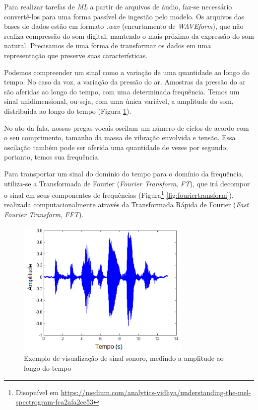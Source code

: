 Para realizar tarefas de \textit{ML} a partir de arquivos de áudio, faz-se necessário convertê-los para uma forma passível de ingestão pelo modelo. Os arquivos das bases de dados estão em formato \textit{.wav} (encurtamento de \textit{WAVEform}), que não realiza compressão do som digital, mantendo-o mais próximo da expressão do som natural. Precisamos de uma forma de transformar os dados em uma representação que preserve suas características.

Podemos compreender um sinal como a variação de uma quantidade ao longo do tempo. No caso da voz, a variação da pressão do ar. Amostras da pressão do ar são aferidas ao longo do tempo, com uma determinada frequência. Temos um sinal unidimensional, ou seja, com uma única variável, a amplitude do som, distribuida ao longo do tempo (Figura \ref{fig:exsinalsom}).

No ato da fala, nossas pregas vocais oscilam um número de ciclos de acordo com o  seu comprimento, tamanho da massa de vibração envolvida e tensão. Essa oscilação também pode ser aferida uma quantidade de vezes por segundo, portanto, temos sua frequência.

Para transportar um sinal do domínio do tempo para o domínio da frequência, utiliza-se a Transformada de Fourier (\textit{Fourier Transform}, \textit{FT}), que irá decompor o sinal em seus componentes de frequências (Figura\footnote{Disopnível em \url{https://medium.com/analytics-vidhya/understanding-the-mel-spectrogram-fca2afa2ce53}} \ref{fig:fouriertransform}), realizada computacionalmente através da Transformada Rápida de Fourier (\textit{Fast Fourier Transform}, \textit{FFT}). %

\clearpage

\begin{figure}[!h]
\centering
\includegraphics[width=0.75\textwidth]{imagens/exsinalsom.PNG}
\caption{\label{fig:exsinalsom}Exemplo de visualização de sinal sonoro, medindo a amplitude ao longo do tempo}

\author{Fonte: UNESP, Prinípios de Comunicações, 2013}
\end{figure}

